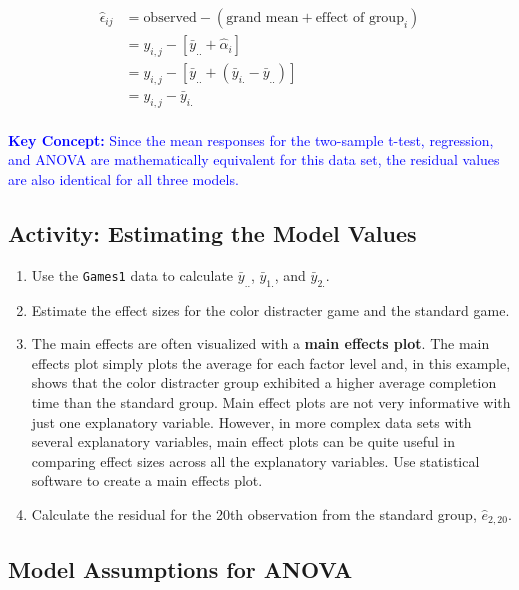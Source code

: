 \documentclass[
]{book}
\begin{document}
\[
\begin{aligned}
\hat{\epsilon}_{ij}  
  &= \text{observed} - (\text{grand mean} + \text{effect of group}_i)\\
  &= y_{i,j} - [\bar{y}_{..} + \hat{\alpha}_i]\\
  &= y_{i,j} - [\bar{y}_{..} + (\bar{y}_{i.} - \bar{y}_{..})]\\
  &= y_{i,j} - \bar{y}_{i.}\\
\end{aligned}  
\]

\textbf{\textcolor{blue}{Key Concept:}}
\textcolor{blue}{Since the mean responses for the two-sample t-test, regression, and ANOVA are mathematically equivalent for this data set, the residual values are also identical for all three models.}

\hypertarget{activity-estimating-the-model-values}{%
\subsection*{Activity: Estimating the Model Values}\label{activity-estimating-the-model-values}}

\begin{enumerate}
\def\labelenumi{\arabic{enumi}.}
\setcounter{enumi}{18}
\item
  Use the \texttt{Games1} data to calculate \(\bar{y}_{..}\), \(\bar{y}_{1.}\), and \(\bar{y}_{2.}\).
\item
  Estimate the effect sizes for the color distracter game and the standard game.
\item
  The main effects are often visualized with a \textbf{main effects plot}. The main effects plot simply plots the average for each factor level and, in this example, shows that the color distracter group exhibited a higher average completion time than the standard group. Main effect plots are not very informative with just one explanatory variable. However, in more complex data sets with several explanatory variables, main effect plots can be quite useful in comparing effect sizes across all the explanatory variables. Use statistical software to create a main effects plot.
\item
  Calculate the residual for the 20th observation from the standard group, \(\hat{e}_{2, 20}\).
\end{enumerate}

\hypertarget{model-assumptions-for-anova}{%
\subsection*{Model Assumptions for ANOVA}\label{model-assumptions-for-anova}}
\end{document}
